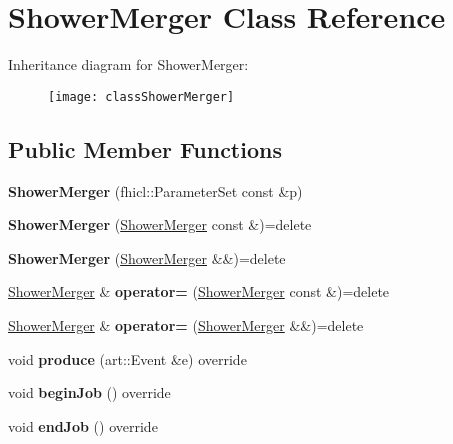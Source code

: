 \hypertarget{classShowerMerger}{\section{Shower\-Merger Class Reference}
\label{classShowerMerger}
}
Inheritance diagram for Shower\-Merger\-:\begin{figure}[H]
\begin{center}
\leavevmode
\texttt{[image: classShowerMerger]}
\end{center}
\end{figure}
\subsection*{Public Member Functions}
\begin{DoxyCompactItemize}
\item 
\hypertarget{classShowerMerger_a50fc7d6db9b3f84bba1d7e7e68f1374e}{{\bfseries Shower\-Merger} (fhicl\-::\-Parameter\-Set const \&p)}\label{classShowerMerger_a50fc7d6db9b3f84bba1d7e7e68f1374e}

\item 
\hypertarget{classShowerMerger_a2b781d7856276bf348a49fd0a06cb24f}{{\bfseries Shower\-Merger} (\hyperlink{classShowerMerger}{Shower\-Merger} const \&)=delete}\label{classShowerMerger_a2b781d7856276bf348a49fd0a06cb24f}

\item 
\hypertarget{classShowerMerger_a080dc5947c74294bf05cb5df45743571}{{\bfseries Shower\-Merger} (\hyperlink{classShowerMerger}{Shower\-Merger} \&\&)=delete}\label{classShowerMerger_a080dc5947c74294bf05cb5df45743571}

\item 
\hypertarget{classShowerMerger_aa2a1c38ecced6bf3708cf075cc871b07}{\hyperlink{classShowerMerger}{Shower\-Merger} \& {\bfseries operator=} (\hyperlink{classShowerMerger}{Shower\-Merger} const \&)=delete}\label{classShowerMerger_aa2a1c38ecced6bf3708cf075cc871b07}

\item 
\hypertarget{classShowerMerger_a93a9e5d5251f530287fdd39f77584bf2}{\hyperlink{classShowerMerger}{Shower\-Merger} \& {\bfseries operator=} (\hyperlink{classShowerMerger}{Shower\-Merger} \&\&)=delete}\label{classShowerMerger_a93a9e5d5251f530287fdd39f77584bf2}

\item 
\hypertarget{classShowerMerger_ab7251dd56c36d4d8ba07437af0b33bb9}{void {\bfseries produce} (art\-::\-Event \&e) override}\label{classShowerMerger_ab7251dd56c36d4d8ba07437af0b33bb9}

\item 
\hypertarget{classShowerMerger_a042daf0f57e3c5c0c08dc9274f98b63e}{void {\bfseries begin\-Job} () override}\label{classShowerMerger_a042daf0f57e3c5c0c08dc9274f98b63e}

\item 
\hypertarget{classShowerMerger_a37852496f6771e29b167cd09c6c65cd0}{void {\bfseries end\-Job} () override}\label{classShowerMerger_a37852496f6771e29b167cd09c6c65cd0}

\end{DoxyCompactItemize}

